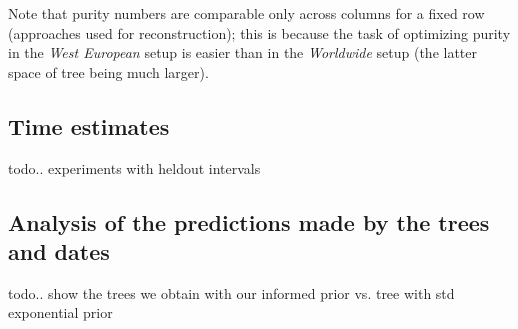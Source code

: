 \documentclass {article}
\begin{document}
Note that purity numbers are comparable only across columns for a fixed row (approaches used for reconstruction); this is because the task of optimizing purity in the \emph{West European} setup is easier than in the \emph{Worldwide} setup (the latter space of tree being much larger).



\subsection{Time estimates}\label{sec:time-exp}

todo.. experiments with heldout intervals

\subsection{Analysis of the predictions made by the trees and dates}

todo.. show the trees we obtain with our informed prior vs. tree with std exponential prior
\end{document}
